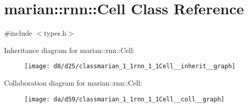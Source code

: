 \hypertarget{classmarian_1_1rnn_1_1Cell}{}\section{marian\+:\+:rnn\+:\+:Cell Class Reference}
\label{classmarian_1_1rnn_1_1Cell}


{\ttfamily \#include $<$types.\+h$>$}



Inheritance diagram for marian\+:\+:rnn\+:\+:Cell\+:
\nopagebreak
\begin{figure}[H]
\begin{center}
\leavevmode
\texttt{[image: d8/d25/classmarian\_1\_1rnn\_1\_1Cell\_\_inherit\_\_graph]}
\end{center}
\end{figure}


Collaboration diagram for marian\+:\+:rnn\+:\+:Cell\+:
\nopagebreak
\begin{figure}[H]
\begin{center}
\leavevmode
\texttt{[image: da/d59/classmarian\_1\_1rnn\_1\_1Cell\_\_coll\_\_graph]}
\end{center}
\end{figure}
